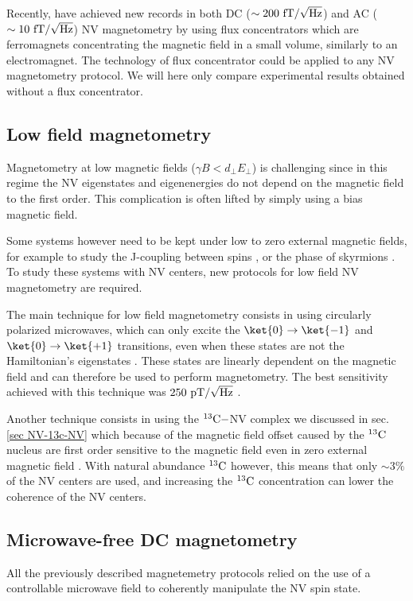 \documentclass[a4paper, 11pt]{report}
\begin{document}
Recently, \citep{xie2021hybrid} have achieved new records in both DC ($\sim 200\ \rm fT/\sqrt{\rm Hz}$) and AC ($\sim 10\ \rm fT/\sqrt{\rm Hz}$) NV magnetometry by using flux concentrators which are ferromagnets concentrating the magnetic field in a small volume, similarly to an electromagnet. The technology of flux concentrator could be applied to any NV magnetometry protocol. We will here only compare experimental results obtained without a flux concentrator.

\subsection{Low field magnetometry}
Magnetometry at low magnetic fields ($\gamma B < d_\perp E_\perp$) is challenging since in this regime the NV eigenstates and eigenenergies do not depend on the magnetic field to the first order. This complication is often lifted  by simply using a bias magnetic field.

Some systems however need to be kept under low to zero external magnetic fields, for example to study the J-coupling between spins \citep{sutter2012computational}, or the phase of skyrmions \citep{zazvorka2020skyrmion}. To study these systems with NV centers, new protocols for low field NV magnetometry are required.

The main technique for low field magnetometry consists in using circularly polarized microwaves, which can only excite the $\ket{0} \to \ket{-1}$ and $\ket{0} \to \ket{+1}$ transitions, even when these states are not the Hamiltonian's eigenstates \citep{mrozek2015circularly, zheng2019zero, lenz2021magnetic, vetter2022zero}. These states are linearly dependent on the magnetic field and can therefore be used to perform magnetometry. The best sensitivity achieved with this technique was $250\ \rm pT/\sqrt{\rm Hz}$ \citep{zheng2019zero}.

Another technique consists in using the $^{13}\rm{C}-$NV complex we discussed in sec. \ref{sec NV-13c-NV} which because of the magnetic field offset caused by the $^{13}\rm{C}$ nucleus are first order sensitive to the magnetic field even in zero external magnetic field \citep{wang2022zero}. With natural abundance $^{13}\rm{C}$ however, this means that only $\sim 3\%$ of the NV centers are used, and increasing the $^{13}\rm{C}$ concentration can lower the coherence of the NV centers. 

\subsection{Microwave-free DC magnetometry}
All the previously described magnetemetry protocols relied on the use of a controllable microwave field to coherently manipulate the NV spin state.
\end{document}
